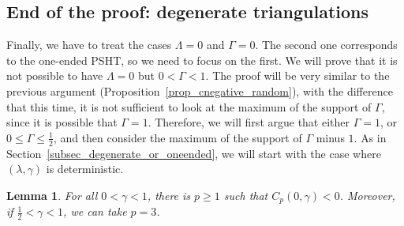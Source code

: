 \documentclass[10pt]{amsart}
\newtheorem{lemm}[theo]{Lemma}\newtheorem{prop}[theo]{Proposition}\newtheorem{coro}[theo]{Corollary}\newtheorem{conj}[theo]{Conjecture}
\theoremstyle{definition}\newtheorem{defi}[theo]{Definition}\newtheorem{rema}[theo]{Remark}\newtheorem{exam}[theo]{Example}\newtheorem{exem}[theo]{Example}\newtheorem{nota}[theo]{Notation}
\begin{document}
\subsection{End of the proof: degenerate triangulations}\label{subsec_end_proof}

Finally, we have to treat the cases $\Lambda=0$ and $\Gamma=0$. The second one corresponds to the one-ended PSHT, so we need to focus on the first. We will prove that it is not possible to have $\Lambda=0$ but $0<\Gamma<1$. The proof will be very similar to the previous argument (Proposition~\ref{prop_cnegative_random}), with the difference that this time, it is not sufficient to look at the maximum of the support of $\Gamma$, since it is possible that $\Gamma=1$. Therefore, we will first argue that either $\Gamma=1$, or $0 \leq \Gamma \leq \frac{1}{2}$, and then consider the maximum of the support of $\Gamma$ minus $1$. As in Section~\ref{subsec_degenerate_or_oneended}, we will start with the case where $(\lambda,\gamma)$ is deterministic.

\begin{lemm}\label{lem_cnegative_deter_lambdazero}
For all $0<\gamma<1$, there is $p \geq 1$ such that $C_p(0,\gamma)<0$. Moreover, if $\frac{1}{2}<\gamma<1$, we can take $p=3$.
\end{lemm}
\end{document}
